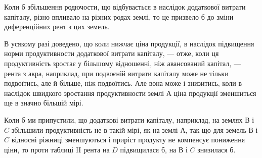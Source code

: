 Коли б збільшення родючости, що відбувається в наслідок додаткової витрати
капіталу, різно впливало на різних родах землі, то це призвело б до зміни
диференційних рент з цих земель.

В усякому разі доведено, що коли нижчає ціна продукції, в наслідок
підвищення норми продуктивности додаткової витрати капіталу, —
отже, коли ця продуктивність зростає у більшому відношенні, ніж авансований
капітал, — рента з акра, наприклад, при подвоєній витрати капіталу може не
тільки подвоїтись, але й більше, ніж подвоїтись. Але вона може і знизитись,
коли в наслідок швидкого зростання продуктивности землі $А$ ціна продукції
зменшиться ще в значно більшій мірі.

Коли б ми припустили, що додаткові витрати капіталу, наприклад, на землях
$В$ і $C$ збільшили продуктивність не в такій мірі, як на землі $А$, так що для земель
$В$ і $C$ відносні ріжниці зменшуються і приріст продукту не компенсує пониження
ціни, то проти таблиці II рента на $D$ підвищилася б, на $В$ і $C$ знизилася
б.
